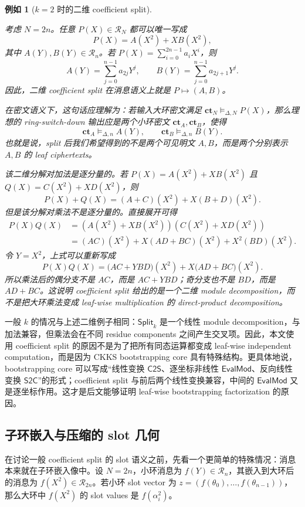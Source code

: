 \documentclass[UTF8,11pt]{article}
\newcommand{\Split}{\mathsf{Split}}
\newcommand{\CtwoS}{\mathsf{C2S}}
\newcommand{\StwoC}{\mathsf{S2C}}
\newcommand{\EvalMod}{\mathsf{EvalMod}}
\newcommand{\ct}{\mathbf{ct}}
\theoremstyle{definition}
\theoremstyle{plain}
\newtheorem{example}{例如}
\begin{document}
\begin{example}[\(k=2\) 时的二维 coefficient split]
\label{ex:k2-coeff-split}

考虑 \(N=2n\)。任意 \(P(X)\in\mathcal R_N\) 都可以唯一写成
\[
P(X)=A(X^2)+XB(X^2),
\]
其中 \(A(Y),B(Y)\in\mathcal R_n\)。若 \(P(X)=\sum_{i=0}^{2n-1}a_iX^i\)，则
\[
A(Y)=\sum_{j=0}^{n-1}a_{2j}Y^j,\qquad
B(Y)=\sum_{j=0}^{n-1}a_{2j+1}Y^j.
\]
因此，二维 coefficient split 在消息语义上就是 \(P\mapsto(A,B)\)。

在密文语义下，这句话应理解为：若输入大环密文满足 \(\ct_N\vDash_{\Delta,N}P(X)\)，那么理想的 ring-switch-down 输出应是两个小环密文 \(\ct_A,\ct_B\)，使得
\[
\ct_A\vDash_{\Delta,n}A(Y),\qquad
\ct_B\vDash_{\Delta,n}B(Y).
\]
也就是说，split 后我们希望得到的不是两个可见明文 \(A,B\)，而是两个分别表示 \(A,B\) 的 leaf ciphertexts。

该二维分解对加法是逐分量的。若 \(P(X)=A(X^2)+XB(X^2)\) 且 \(Q(X)=C(X^2)+XD(X^2)\)，则
\[
P(X)+Q(X)=(A+C)(X^2)+X(B+D)(X^2).
\]
但是该分解对乘法不是逐分量的。直接展开可得
\[
\begin{aligned}
P(X)Q(X)
&=(A(X^2)+XB(X^2))(C(X^2)+XD(X^2))\\
&=(AC)(X^2)+X(AD+BC)(X^2)+X^2(BD)(X^2).
\end{aligned}
\]
令 \(Y=X^2\)，上式可以重新写成
\[
P(X)Q(X)=\bigl(AC+YBD\bigr)(X^2)+X\bigl(AD+BC\bigr)(X^2).
\]
所以乘法后的偶分支不是 \(AC\)，而是 \(AC+YBD\)；奇分支也不是 \(BD\)，而是 \(AD+BC\)。这说明 coefficient split 给出的是一个二维 module decomposition，而不是把大环乘法变成 leaf-wise multiplication 的 direct-product decomposition。
\end{example}

一般 \(k\) 的情况与上述二维例子相同：\(\Split_k\) 是一个线性 module decomposition，与加法兼容，但乘法会在不同 residue components 之间产生交叉项。因此，本文使用 coefficient split 的原因不是为了把所有同态运算都变成 leaf-wise independent computation，而是因为 CKKS bootstrapping core 具有特殊结构。更具体地说，bootstrapping core 可以写成“线性变换 \(\CtwoS\)、逐坐标非线性 \(\EvalMod\)、反向线性变换 \(\StwoC\)”的形式；coefficient split 与前后两个线性变换兼容，中间的 \(\EvalMod\) 又是逐坐标作用。这才是后文能够证明 leaf-wise bootstrapping factorization 的原因。

\subsection{子环嵌入与压缩的 slot 几何}
\label{subsec:subring-embedding-slot-geometry}

在讨论一般 coefficient split 的 slot 语义之前，先看一个更简单的特殊情况：消息本来就在子环嵌入像中。设 \(N=2n\)，小环消息为 \(f(Y)\in\mathcal R_n\)，其嵌入到大环后的消息为 \(f(X^2)\in\mathcal R_{2n}\)。若小环 slot vector 为 \(z=(f(\theta_0),\ldots,f(\theta_{n-1}))\)，那么大环中 \(f(X^2)\) 的 slot values 是 \(f(\alpha_i^2)\)。
\end{document}
